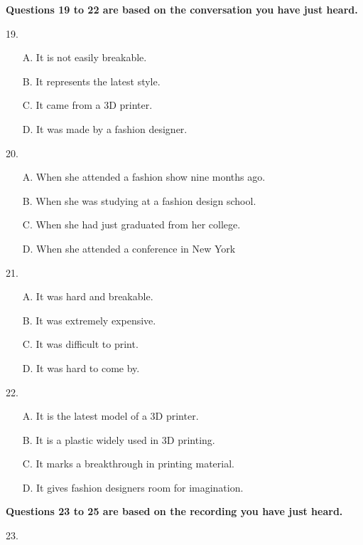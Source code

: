\documentclass[UTF8,11pt]{ctexart}
\begin{document}
\textbf{Questions 19 to 22 are based on the conversation you have just heard.}


19.


\begin{itemize}[leftmargin=2em,itemsep=.2em,topsep=.4em]\item[A.] It is not easily breakable.
\item[B.] It represents the latest style.
\item[C.] It came from a 3D printer.
\item[D.] It was made by a fashion designer.
\end{itemize}

20.


\begin{itemize}[leftmargin=2em,itemsep=.2em,topsep=.4em]\item[A.] When she attended a fashion show nine months ago.
\item[B.] When she was studying at a fashion design school.
\item[C.] When she had just graduated from her college.
\item[D.] When she attended a conference in New York
\end{itemize}

21.


\begin{itemize}[leftmargin=2em,itemsep=.2em,topsep=.4em]\item[A.] It was hard and breakable.
\item[B.] It was extremely expensive.
\item[C.] It was difficult to print.
\item[D.] It was hard to come by.
\end{itemize}

22.


\begin{itemize}[leftmargin=2em,itemsep=.2em,topsep=.4em]\item[A.] It is the latest model of a 3D printer.
\item[B.] It is a plastic widely used in 3D printing.
\item[C.] It marks a breakthrough in printing material.
\item[D.] It gives fashion designers room for imagination.
\end{itemize}

\textbf{Questions 23 to 25 are based on the recording you have just heard.}


23.
\end{document}
